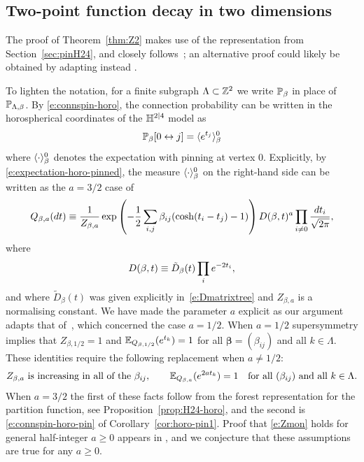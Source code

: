 \documentclass[11pt]{amsart}
\numberwithin{equation}{section}
\numberwithin{theorem}{section}
\newcommand{\ob}[1]{\left(#1\right )} %
\newcommand{\V}[1]{\boldsymbol{#1}}
\begin{document}
\subsection{Two-point function decay in two dimensions}

The proof of Theorem~\ref{thm:Z2}
makes use of the representation from
Section~\ref{sec:pinH24}, and closely follows~\cite{1907.07949};
an alternative proof could likely be obtained by adapting instead \cite{1911.08579}.

To lighten the notation, for a finite subgraph
$\Lambda\subset \Z^{2}$ we write $\P_{\beta}$ in place of
$\P_{\Lambda,\beta}$.
By \eqref{e:connspin-horo}, the connection
probability can be written in the horospherical coordinates of the
$\HH^{2|4}$ model as
\begin{equation} \label{e:connspin-horo-bis}
  \P_\beta[0 \leftrightarrow j] = \avg{e^{t_j}}_\beta^0
\end{equation}
where $\avg{\cdot}^0_\beta$ denotes the expectation with pinning at
vertex $0$.  Explicitly, by \eqref{e:expectation-horo-pinned}, the
measure $\avg{\cdot}_\beta^0$ on the right-hand side can be written as
the $a=3/2$ case of
\begin{equation}
  Q_{\beta,a}(dt) \bydef
\frac{1}{Z_{\beta,a}} \exp\ob{-\frac12 \sum_{i,j} \beta_{ij} (\cosh(t_i-t_j)-1)} D(\beta,t)^a \prod_{i\neq 0} \frac{dt_i}{ \sqrt{2\pi}},
\end{equation}
where
\begin{equation}
  D(\beta,t) \bydef
\tilde D_\beta(t) \prod_{i} e^{- 2 t_i},
\end{equation}
and where $\tilde D_{\beta}(t)$ was given explicitly in~\eqref{e:Dmatrixtree} and
$Z_{\beta,a}$ is a normalising constant. We have made the parameter $a$
explicit as our argument adapts that of~\cite{1907.07949}, which concerned the
case $a=1/2$. When $a=1/2$
supersymmetry implies that 
$Z_{\beta,1/2} =1$ and $\E_{Q_{\beta,1/2}}(e^{t_k})=1$ for all $\V{\beta}=(\beta_{ij})$ and all $k\in\Lambda$.
These identities require the following replacement when $a\neq 1/2$: 
  \begin{equation} \label{e:Zmon}
    Z_{\beta,a} \text{ is increasing in all of the $\beta_{ij}$},
    \qquad
    \E_{Q_{\beta,a}}(e^{2at_k}) = 1 \quad \text{for all $(\beta_{ij})$ and all $k\in\Lambda$.}
  \end{equation}
  When $a=3/2$ the first of these facts follow from the forest representation for
  the partition function, see Proposition~\ref{prop:H24-horo},
  and the second is \eqref{e:connspin-horo-pin} of Corollary~\ref{cor:horo-pin1}.
  Proof that \eqref{e:Zmon} holds for general half-integer $a \geq 0$
  appears in \cite{1912.05817}, and we conjecture that these
    assumptions are true for any $a\geq 0$.
\end{document}
